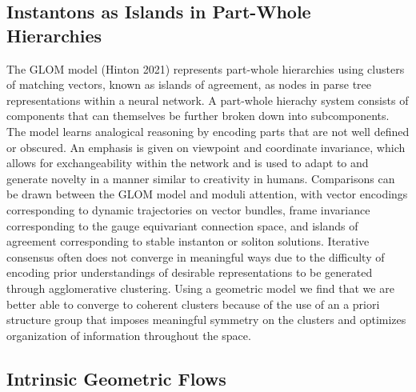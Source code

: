 \documentclass{article}
\begin{document}
\subsection{Instantons as Islands in Part-Whole Hierarchies}
    The GLOM model (Hinton 2021) represents part-whole hierarchies using clusters of matching vectors, known as islands of agreement, as nodes in parse tree representations within a neural network. A part-whole hierachy system consists of components that can themselves be further broken down into subcomponents. The model learns analogical reasoning by encoding parts that are not well defined or obscured. An emphasis is given on viewpoint and coordinate invariance, which allows for exchangeability within the network and is used to adapt to and generate novelty in a manner similar to creativity in humans. Comparisons can be drawn between the GLOM model and moduli attention, with vector encodings corresponding to dynamic trajectories on vector bundles, frame invariance corresponding to the gauge equivariant connection space, and islands of agreement corresponding to stable instanton or soliton solutions. Iterative consensus often does not converge in meaningful ways due to the difficulty of encoding prior understandings of desirable representations to be generated through agglomerative clustering. Using a geometric model we find that we are better able to converge to coherent clusters because of the use of an a priori structure group that imposes meaningful symmetry on the clusters and optimizes organization of information throughout the space. 
    



    
    
\subsection{Intrinsic Geometric Flows}
    
\end{document}
